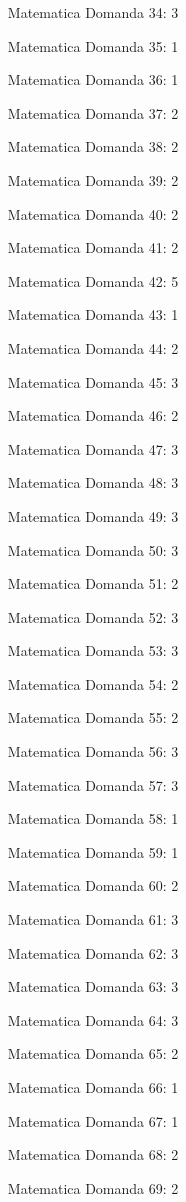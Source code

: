 \documentclass[20pt, a4paper]{article}
\begin{document}
\begin{itemize}[leftmargin=*]
\item [Matematica] Domanda 34: 3
\item [Matematica] Domanda 35: 1
\item [Matematica] Domanda 36: 1
\item [Matematica] Domanda 37: 2
\item [Matematica] Domanda 38: 2
\item [Matematica] Domanda 39: 2
\item [Matematica] Domanda 40: 2
\item [Matematica] Domanda 41: 2
\item [Matematica] Domanda 42: 5
\item [Matematica] Domanda 43: 1
\item [Matematica] Domanda 44: 2
\item [Matematica] Domanda 45: 3
\item [Matematica] Domanda 46: 2
\item [Matematica] Domanda 47: 3
\item [Matematica] Domanda 48: 3
\item [Matematica] Domanda 49: 3
\item [Matematica] Domanda 50: 3
\item [Matematica] Domanda 51: 2
\item [Matematica] Domanda 52: 3
\item [Matematica] Domanda 53: 3
\item [Matematica] Domanda 54: 2
\item [Matematica] Domanda 55: 2
\item [Matematica] Domanda 56: 3
\item [Matematica] Domanda 57: 3
\item [Matematica] Domanda 58: 1
\item [Matematica] Domanda 59: 1
\item [Matematica] Domanda 60: 2
\item [Matematica] Domanda 61: 3
\item [Matematica] Domanda 62: 3
\item [Matematica] Domanda 63: 3
\item [Matematica] Domanda 64: 3
\item [Matematica] Domanda 65: 2
\item [Matematica] Domanda 66: 1
\item [Matematica] Domanda 67: 1
\item [Matematica] Domanda 68: 2
\item [Matematica] Domanda 69: 2

\end{itemize}
\end{document}
